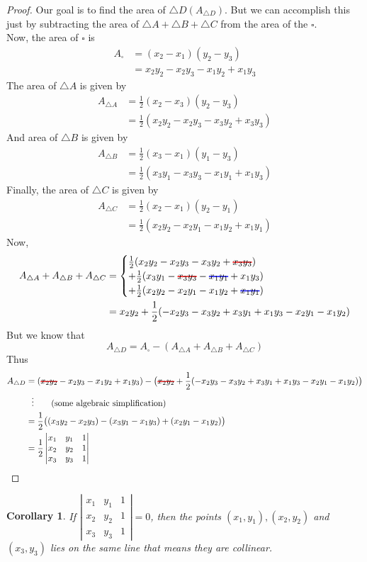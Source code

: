 \documentclass[12pt]{article}
\newcommand\hcancel[2][black]{\setbox0=\hbox{$#2$}%
\rlap{\raisebox{.45\ht0}{\textcolor{#1}{\rule{\wd0}{1pt}}}}#2}
\newtheorem{cor}[thm]{Corollary}
\theoremstyle{definition}
\begin{document}
\begin{proof}
Our goal  is to find the area of $\triangle D(A_{\triangle D})$. But we can accomplish this just by subtracting the area of $\triangle A+\triangle B+\triangle C$ from the area of the $\square$.\\
Now, the area of $\square$ is
\begin{align*}
A_{\square}&=(x_2-x_1)(y_2-y_3)\\
           &=x_2y_2-x_2y_3-x_1y_2+x_1y_3
\end{align*}
The area of $\triangle A$ is given by
\begin{align*}
A_{\triangle A}&=\frac{1}{2}(x_2-x_3)(y_2-y_3)\\
                  &=\frac{1}{2}(x_2y_2-x_2y_3-x_3y_2+x_3y_3)
\end{align*}
And area of $\triangle B$ is given by
\begin{align*}
A_{\triangle B}&=\frac{1}{2}(x_3-x_1)(y_1-y_3)\\
                  &=\frac{1}{2}(x_3y_1-x_3y_3-x_1y_1+x_1y_3)
\end{align*}
Finally, the area of $\triangle C$ is given by
\begin{align*}
A_{\triangle C}&=\frac{1}{2}(x_2-x_1)(y_2-y_1)\\
                  &=\frac{1}{2}(x_2y_2-x_2y_1-x_1y_2+x_1y_1)
\end{align*}
Now,
\begin{align*}
A_{\triangle A}+A_{\triangle B}+A_{\triangle C}&=
\begin{cases}
\frac{1}{2}(x_2y_2-x_2y_3-x_3y_2+\hcancel[red]{x_3y_3})\\
+\frac{1}{2}(x_3y_1-\hcancel[red]{x_3y_3}-\hcancel[blue]{x_1y_1}+x_1y_3)\\
+\frac{1}{2}(x_2y_2-x_2y_1-x_1y_2+\hcancel[blue]{x_1y_1})
\end{cases}\\
&=x_2y_2+\frac{1}{2}(-x_2y_3-x_3y_2+ x_3y_1+x_1y_3-x_2y_1-x_1y_2)
\end{align*}
But we know that
\[A_{\triangle D} =A_{\square}-(A_{\triangle A}+A_{\triangle B}+A_{\triangle C})\]
Thus
\begin{align*}
A_{\triangle D} &= (\hcancel[red]{x_2y_2}-x_2y_3-x_1y_2+x_1y_3)-\bigl(\hcancel[red]{x_2y_2}+\frac{1}{2}(-x_2y_3-x_3y_2+ x_3y_1+x_1y_3-x_2y_1-x_1y_2)\bigl)\\
                &\ \ \vdots\tag{some algebraic simplification}\\
                &=\frac{1}{2}\bigl((x_3 y_2-x_2y_3)-(x_3y_1-x_1y_3)+(x_2y_1-x_1y_2)\bigl)\\
                &=\frac{1}{2}\left|
    \begin{matrix}
      x_1 & y_1 & 1\\
      x_2 & y_2 & 1\\
      x_3 & y_3 & 1
    \end{matrix}
    \right|
\end{align*}
\end{proof}
\begin{cor}
  If $\left|\begin{matrix}
      x_1 & y_1 & 1\\
      x_2 & y_2 & 1\\
      x_3 & y_3 & 1
    \end{matrix}
    \right|=0$, then the points $(x_1,y_1),( x_2,y_2)$ and $(x_3,y_3)$ lies on the same line that means they are collinear.
\end{cor}
\end{document}
